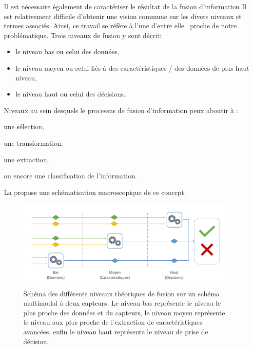 Il est nécessaire également de caractériser le résultat de la fusion d'information
Il est relativement difficile d'obtenir une vision commune sur les divers niveaux et termes associés. Ainsi, ce travail se réfère à l'une d'entre elle~\cite{Dasarathy1997} proche de notre problématique. Trois niveaux de fusion y sont décrit:
\begin{itemize}
\item le niveau bas ou celui des données,
\item le niveau moyen ou celui liés à des caractéristiques / des données de plus haut niveau,
\item le niveau haut ou celui des décisions.
\end{itemize} Niveaux au sein desquels le processus de fusion d'information peux aboutir à :
\begin{inlinerate}
\item une sélection,
\item une transformation,
\item une extraction,
\item ou encore une classification de l'information.
\end{inlinerate} La  propose une schématisation macroscopique de ce concept.\par
 
\begin{figure}[H]
    \centering
    \includegraphics[width=\linewidth]{contents/chapter_3/resources/scheme_overview_fusion.pdf}
    \caption{Schéma des différents niveaux théoriques de fusion sur un schéma multimodal à deux capteurs. Le niveau bas représente le niveau le plus proche des données et du capteurs, le niveau moyen représente le niveau aux plus proche de l'extraction de caractéristiques avancées, enfin le niveau haut représente le niveau de prise de décision.}
    \label{fig:scheme_overview_fusion}
\end{figure}\par

